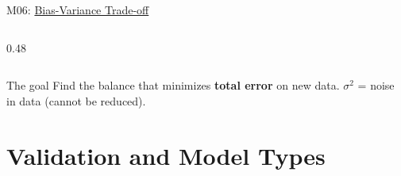 \documentclass[aspectratio=169, 10pt]{beamer}
\begin{document}
\begin{frame}{M06: \href{https://en.wikipedia.org/wiki/Bias\%E2\%80\%93variance_tradeoff}{Bias-Variance Trade-off}}
\begin{columns}
\begin{column}{0.48\textwidth}
\begin{center}
            \end{center}
        \end{column}
    \end{columns}

    \begin{block}{\scriptsize The goal}
        \scriptsize Find the balance that minimizes \textbf{total error} on new data. $\sigma^2$ = noise in data (cannot be reduced).
    \end{block}

\end{frame}

\section{Validation and Model Types}
\end{document}
